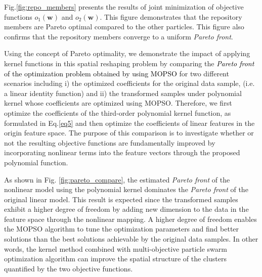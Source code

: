 Fig.\ref{fig:repo_members} presents the results of joint minimization of objective functions $o_1(\mathbf{w})$ and $o_2(\mathbf{w})$. This figure demonstrates that the repository members are Pareto optimal compared to the other particles. This figure also confirms that the repository members converge to a uniform \textit{Pareto front}. 

Using the concept of Pareto optimality, we demonstrate the impact of applying kernel functions in this spatial reshaping problem by comparing the \textcolor{black}{\textit{Pareto front} of the optimization problem obtained by using MOPSO} for two different scenarios including i) the optimized coefficients for the original data sample, (i.e. a linear identity function) and ii) the transformed samples under polynomial kernel whose coefficients are optimized using MOPSO. Therefore, we first optimize the coefficients of the third-order polynomial kernel function, as formulated in Eq.\ref{eq5} and then optimize the coefficients of linear features in the origin feature space. The purpose of this comparison is to investigate whether or not the resulting objective functions are fundamentally improved by incorporating nonlinear terms into the feature vectors through the proposed polynomial function.  %


As shown in Fig. \ref{fig:pareto_compare}, the estimated \textit{Pareto front} of the nonlinear model using the polynomial kernel dominates the \textit{Pareto front} of the original linear model. This result is expected since the transformed samples exhibit a higher degree of freedom by adding new dimension to the data in the feature space through the nonlinear mapping. 
A higher degree of freedom enables the MOPSO algorithm to tune the optimization parameters and find better solutions than the best solutions achievable by the original data samples. In other words, the kernel method combined with multi-objective particle swarm optimization algorithm can improve the spatial structure of the clusters quantified by the two objective functions.

